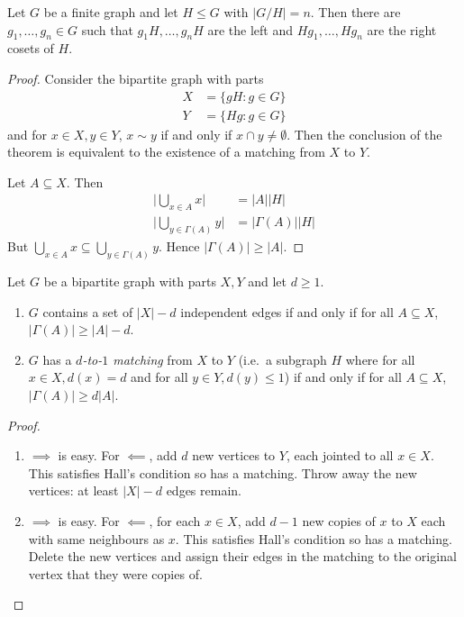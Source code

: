 \documentclass[a4paper]{article}
\begin{document}
\begin{corollary}
  Let \(G\) be a finite graph and let \(H \leq G\) with \(|G/H| = n\). Then there are \(g_1, \dots, g_n \in G\) such that \(g_1H, \dots, g_nH\) are the left and \(Hg_1, \dots, Hg_n\) are the right cosets of \(H\).
\end{corollary}

\begin{proof}
  Consider the bipartite graph with parts
  \begin{align*}
    X &= \{gH: g \in G\} \\
    Y &= \{Hg: g \in G\}
  \end{align*}
  and for \(x \in X, y \in Y\), \(x \sim y\) if and only if \(x \cap y \neq \emptyset\). Then the conclusion of the theorem is equivalent to the existence of a matching from \(X\) to \(Y\).

  Let \(A \subseteq X\). Then
  \begin{align*}
    \Big| \bigcup_{x \in A} x \Big| &= |A| |H| \\
    \Big| \bigcup_{y \in \Gamma(A)} y \Big| &= |\Gamma(A)| |H|
  \end{align*}
  But \(\bigcup_{x \in A} x \subseteq \bigcup_{y \in \Gamma(A)} y\). %
  Hence \(|\Gamma(A)| \geq |A|\).
\end{proof}

\begin{corollary}
  Let \(G\) be a bipartite graph with parts \(X, Y\) and let \(d \geq 1\).
  \begin{enumerate}
  \item \(G\) contains a set of \(|X| - d\) independent edges if and only if for all \(A \subseteq X\), \(|\Gamma(A)| \geq |A| - d\).
  \item \(G\) has a \emph{\(d\)-to-\(1\) matching} from \(X\) to \(Y\) (i.e.\ a subgraph \(H\) where for all \(x \in X, d(x) = d\) and for all \(y \in Y, d(y) \leq 1\)) if and only if for all \(A \subseteq X\), \(|\Gamma(A)| \geq d|A|\).
  \end{enumerate}
\end{corollary}

\begin{proof}\leavevmode
  \begin{enumerate}
  \item \(\implies\) is easy. For \(\impliedby\), add \(d\) new vertices to \(Y\), each jointed to all \(x \in X\). This satisfies Hall's condition so has a matching. Throw away the new vertices: at least \(|X| - d\) edges remain.
  \item \(\implies\) is easy. For \(\impliedby\), for each \(x \in X\), add \(d - 1\) new copies of \(x\) to \(X\) each with same neighbours as \(x\). This satisfies Hall's condition so has a matching. Delete the new vertices and assign their edges in the matching to the original vertex that they were copies of.
  \end{enumerate}
\end{proof}
\end{document}

